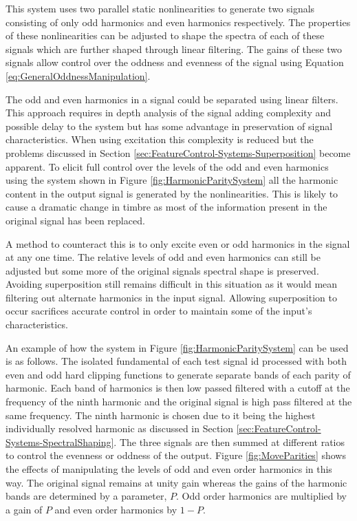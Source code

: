 			This system uses two parallel static nonlinearities to generate two signals consisting of only odd
			harmonics and even harmonics respectively. The properties of these nonlinearities can be adjusted
			to shape the spectra of each of these signals which are further shaped through linear filtering.
			The gains of these two signals allow control over the oddness and evenness of the signal using
			Equation \ref{eq:GeneralOddnessManipulation}.

			The odd and even harmonics in a signal could be separated using linear filters. This approach
			requires in depth analysis of the signal adding complexity and possible delay to the system but has
			some advantage in preservation of signal characteristics. When using excitation this complexity is
			reduced but the problems discussed in Section \ref{sec:FeatureControl-Systems-Superposition} become
			apparent. To elicit full control over the levels of the odd and even harmonics using the system
			shown in Figure \ref{fig:HarmonicParitySystem} all the harmonic content in the output signal is
			generated by the nonlinearities. This is likely to cause a dramatic change in timbre as most of the
			information present in the original signal has been replaced. 

			A method to counteract this is to only excite even or odd harmonics in the signal at any one time.
			The relative levels of odd and even harmonics can still be adjusted but some more of the original
			signals spectral shape is preserved. Avoiding superposition still remains difficult in this
			situation as it would mean filtering out alternate harmonics in the input signal. Allowing
			superposition to occur sacrifices accurate control in order to maintain some of the input's
			characteristics.

			An example of how the system in Figure \ref{fig:HarmonicParitySystem} can be used is as follows.
			The isolated fundamental of each test signal id processed with both even and odd hard clipping
			functions to generate separate bands of each parity of harmonic. Each band of harmonics is then low
			passed filtered with a cutoff at the frequency of the ninth harmonic and the original signal is
			high pass filtered at the same frequency. The ninth harmonic is chosen due to it being the highest
			individually resolved harmonic as discussed in Section
			\ref{sec:FeatureControl-Systems-SpectralShaping}. The three signals are then summed at different
			ratios to control the evenness or oddness of the output. Figure \ref{fig:MoveParities} shows the
			effects of manipulating the levels of odd and even order harmonics in this way. The original signal
			remains at unity gain whereas the gains of the harmonic bands are determined by a parameter, $P$.
			Odd order harmonics are multiplied by a gain of $P$ and even order harmonics by $1 - P$.

